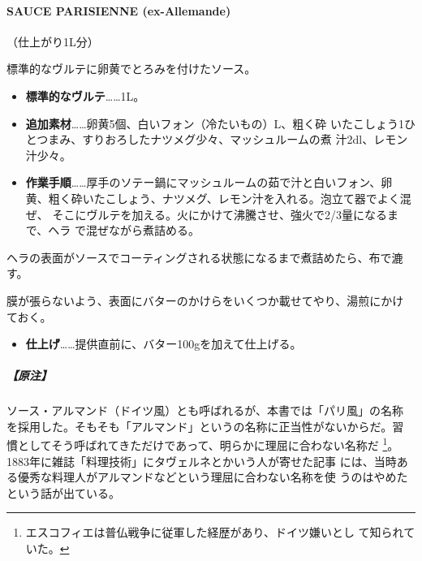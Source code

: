 \begin{recette}
\hypertarget{sauce-allemande}{%
\paragraph{SAUCE PARISIENNE (ex-Allemande)}\label{sauce-allemande}}


（仕上がり1L分）

標準的なヴルテに卵黄でとろみを付けたソース。

\begin{itemize}
\item
  \textbf{標準的なヴルテ}\ldots{}\ldots{}1L。
\item
  \textbf{追加素材}\ldots{}\ldots{}卵黄5個、白いフォン（冷たいもの）\undemi{}L、粗く砕
  いたこしょう1ひとつまみ、すりおろしたナツメグ少々、マッシュルームの煮
  汁2dl、レモン汁少々。
\item
  \textbf{作業手順}\ldots{}\ldots{}厚手のソテー鍋にマッシュルームの茹で汁と白いフォン、卵
  黄、粗く砕いたこしょう、ナツメグ、レモン汁を入れる。泡立て器でよく混ぜ、
  そこにヴルテを加える。火にかけて沸騰させ、強火で2/3量になるまで、ヘラ
  で混ぜながら煮詰める。
\end{itemize}

ヘラの表面がソースでコーティングされる状態になるまで煮詰めたら、布で漉
す。

膜が張らないよう、表面にバターのかけらをいくつか載せてやり、湯煎にかけ
ておく。

\begin{itemize}
\tightlist
\item
  \textbf{仕上げ}\ldots{}\ldots{}提供直前に、バター100gを加えて仕上げる。
\end{itemize}

\hypertarget{ux539fux6ce8-3}{%
\subparagraph{【原注】}\label{ux539fux6ce8-3}}

ソース・アルマンド（ドイツ風）とも呼ばれるが、本書では「パリ風」の名称
を採用した。そもそも「アルマンド」というの名称に正当性がないからだ。習
慣としてそう呼ばれてきただけであって、明らかに理屈に合わない名称だ
\footnote{エスコフィエは普仏戦争に従軍した経歴があり、ドイツ嫌いとし
  て知られていた。}。1883年に雑誌「料理技術」にタヴェルネとかいう人が寄せた記事
には、当時ある優秀な料理人がアルマンドなどという理屈に合わない名称を使
うのはやめたという話が出ている。


\end{recette}
